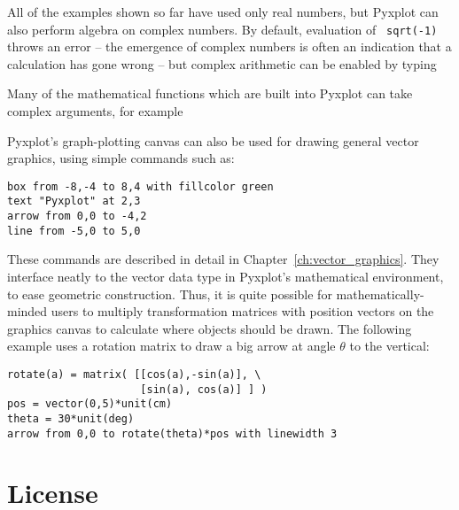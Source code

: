 \vspace{3mm}

\vspace{3mm}

All of the examples shown so far have used only real numbers, but Pyxplot can
also perform algebra on complex numbers. By default, evaluation of {\tt
sqrt(-1)} throws an error -- the emergence of complex numbers is often an
indication that a calculation has gone wrong -- but complex arithmetic can be
enabled by typing

\vspace{3mm}

\vspace{3mm}

\noindent Many of the mathematical functions which are built into Pyxplot can take complex arguments, for example

\vspace{3mm}

\vspace{3mm}


Pyxplot's graph-plotting canvas can also be used for drawing general vector graphics, using simple commands such as:

\begin{verbatim}
box from -8,-4 to 8,4 with fillcolor green
text "Pyxplot" at 2,3
arrow from 0,0 to -4,2
line from -5,0 to 5,0
\end{verbatim}

\noindent These commands are described in detail in
Chapter~\ref{ch:vector_graphics}. They interface neatly to the vector data type
in Pyxplot's mathematical environment, to ease geometric construction. Thus, it
is quite possible for mathematically-minded users to multiply transformation
matrices with position vectors on the graphics canvas to calculate where
objects should be drawn. The following example uses a rotation matrix to draw a
big arrow at angle $\theta$ to the vertical:

\begin{verbatim}
rotate(a) = matrix( [[cos(a),-sin(a)], \
                     [sin(a), cos(a)] ] )
pos = vector(0,5)*unit(cm)
theta = 30*unit(deg)
arrow from 0,0 to rotate(theta)*pos with linewidth 3
\end{verbatim}

\section{License}

